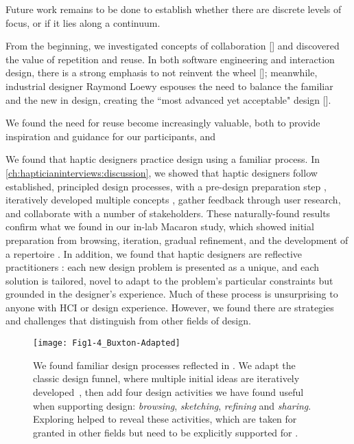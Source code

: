 Future work remains to be done to establish whether there are discrete levels of focus, or if it lies along a continuum.


From the beginning, we investigated concepts of collaboration [] and discovered the value of repetition and reuse.
In both software engineering and interaction design, there is a strong emphasis to not reinvent the wheel [];
meanwhile, industrial designer Raymond Loewy espouses the need to balance the familiar and the new in design, creating the ``most advanced yet acceptable" design [].

We found the need for reuse become increasingly valuable, both to provide inspiration and guidance for our participants, and 


We found that haptic designers practice design using a familiar process.
In \autoref{ch:hapticianinterviews:discussion}, we showed that haptic designers follow established, principled design processes, with a pre-design preparation step \cite{Warr2005,Schon1982,Shneiderman2000}, iteratively developed multiple concepts \cite{Buxton2007,Hartmann2008}, gather feedback through user research, and collaborate with a number of stakeholders.
These naturally-found results confirm what we found in our in-lab Macaron study, which showed initial preparation from browsing, iteration, gradual refinement, and the development of a repertoire \cite{Schon1982}.
In addition, we found that haptic designers are reflective practitioners \cite{Schon1982}: each new design problem is presented as a unique, and each solution is tailored, novel to adapt to the problem's particular constraints but grounded in the designer's experience.
Much of these process is unsurprising to anyone with HCI or design experience.
However, we found there are strategies and challenges that distinguish \haxd from other fields of design.

\begin{figure}[htbp] %
   \centering
   \texttt{[image: Fig1-4\_Buxton-Adapted]} 
   \caption{We found familiar design processes reflected in \haxd. We adapt the classic design funnel, where multiple initial ideas are iteratively developed~\cite{Buxton2007}, then add four design activities we have found useful when supporting design: \textit{browsing}, \textit{sketching}, \textit{refining} and \textit{sharing}. Exploring \haxd helped to reveal these activities, which are taken for granted in other fields but need to be explicitly supported for \haxd.}
   \label{fig:conclusion:buxtonaugmented}
\end{figure}

